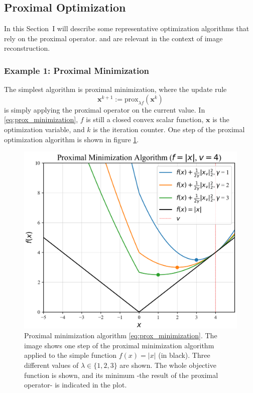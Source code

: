 
\subsection{Proximal Optimization}

In this Section~I will describe some representative optimization algorithms that rely on the proximal operator. and are relevant in the context of image reconstruction.

\subsubsection{Example 1: Proximal Minimization}

The simplest algorithm is proximal minimization, where the update rule 
\begin{equation}
    \mathbf{x}^{k+1} := \mathrm{prox}_{\lambda f}(\mathbf{x}^k)
    \label{eq:prox_minimization}
\end{equation}
is simply applying the proximal operator on the current value.
In  \eqref{eq:prox_minimization}, $f$ is still a closed convex scalar function, $\mathbf{x}$ is the optimization variable, and $k$ is the iteration counter. One step of the proximal optimization algorithm is shown in figure \ref{fig:proximal_minimization}. 

\begin{figure}[H]
  \begin{center}
  \includegraphics[scale = 0.7]{images/Proximal_minimization.PNG}
  \caption{Proximal minimization algorithm \eqref{eq:prox_minimization}. The image shows one step of the proximal minimization algorithm applied to the simple function $f(x) = |x|$ (in black). Three different values of $\lambda \in \{1, 2, 3\}$ are shown. The whole objective function is shown, and its minimum -the result of the proximal operator- is indicated in the plot.}
  \label{fig:proximal_minimization}
  \end{center}
\end{figure}

